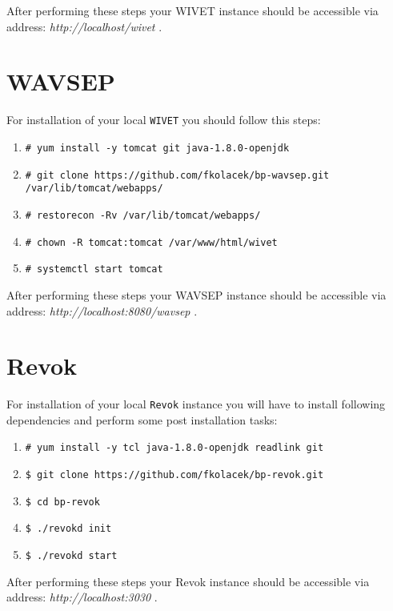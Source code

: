 	After performing these steps your WIVET instance should be accessible via address: \textit{http://localhost/wivet} .

	\section{WAVSEP}\label{app:installation-of-wavsep}

	For installation of your local \texttt{WIVET} you should follow this steps:
	
	\begin{enumerate}
		\item \texttt{\# yum install -y tomcat git java-1.8.0-openjdk}
		\item \texttt{\# git clone https://github.com/fkolacek/bp-wavsep.git /var/lib/tomcat/webapps/}
		\item \texttt{\# restorecon -Rv /var/lib/tomcat/webapps/}
		\item \texttt{\# chown -R tomcat:tomcat /var/www/html/wivet}
		\item \texttt{\# systemctl start tomcat}				
	\end{enumerate}
	
	After performing these steps your WAVSEP instance should be accessible via address: \textit{http://localhost:8080/wavsep} .
	
	\section{Revok}\label{app:installation-of-revok}
	
	For installation of your local \texttt{Revok} instance you will have to install following dependencies and perform some post installation tasks:

			\begin{enumerate}
				\item \texttt{\# yum install -y tcl java-1.8.0-openjdk readlink git}
				\item \texttt{\$ git clone https://github.com/fkolacek/bp-revok.git}
				\item \texttt{\$ cd bp-revok}				
				\item \texttt{\$ ./revokd init}	
				\item \texttt{\$ ./revokd start}	
			\end{enumerate}
			
	After performing these steps your Revok instance should be accessible via address: \textit{http://localhost:3030} .
	
